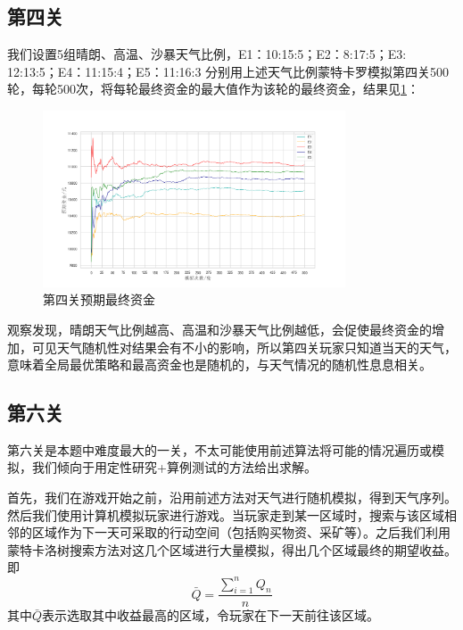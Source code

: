 \documentclass[withoutpre]{cumcmthesis} %
\begin{document}
\subsection{第四关}
我们设置5组晴朗、高温、沙暴天气比例，E1：10:15:5；E2：8:17:5；E3: 12:13:5；E4：11:15:4；E5：11:16:3
分别用上述天气比例蒙特卡罗模拟第四关500轮，每轮500次，将每轮最终资金的最大值作为该轮的最终资金，结果见\cref{fig:analysis4}：
\begin{figure}[H]
    \centering
    \includegraphics[width=0.8\textwidth]{figures/anaysis4.png}
    \caption{第四关预期最终资金}
    \label{fig:analysis4}
\end{figure}
观察发现，晴朗天气比例越高、高温和沙暴天气比例越低，会促使最终资金的增加，可见天气随机性对结果会有不小的影响，所以第四关玩家只知道当天的天气，意味着全局最优策略和最高资金也是随机的，与天气情况的随机性息息相关。

\subsection{第六关}
第六关是本题中难度最大的一关，不太可能使用前述算法将可能的情况遍历或模拟，我们倾向于用定性研究+算例测试的方法给出求解。

首先，我们在游戏开始之前，沿用前述方法对天气进行随机模拟，得到天气序列。然后我们使用计算机模拟玩家进行游戏。当玩家走到某一区域时，搜索与该区域相邻的区域作为下一天可采取的行动空间（包括购买物资、采矿等）。之后我们利用蒙特卡洛树搜索方法对这几个区域进行大量模拟，得出几个区域最终的期望收益。即
\begin{equation}
	\bar{Q}=\displaystyle\frac{\sum_{i=1}^{n}Q_n}{n}
\end{equation}
其中$\bar{Q}$表示选取其中收益最高的区域，令玩家在下一天前往该区域。
\begin{thebibliography}{9}%

    

\end{thebibliography}
\end{document}
